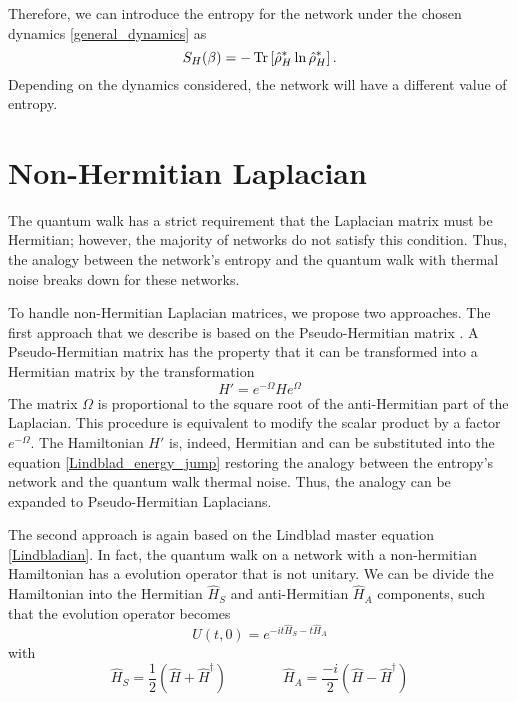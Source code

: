 Therefore, we can introduce the entropy for the network under the chosen dynamics \eqref{general_dynamics} as 
\begin{equation}
    S_H(\beta) = -\operatorname{Tr}\left[\hat\rho_H^*\ln\hat\rho_H^* \right].
\end{equation}
Depending on the dynamics considered, the network will have a different value of entropy.



\section{Non-Hermitian Laplacian}

The quantum walk has a strict requirement that the Laplacian matrix must be Hermitian; however, the majority of networks do not satisfy this condition. Thus, the analogy between the network's entropy and the quantum walk with thermal noise breaks down for these networks.

To handle non-Hermitian Laplacian matrices, we propose two approaches.
The first approach that we describe is based on the Pseudo-Hermitian matrix \cite{Pseudo_Hermitian}.
A Pseudo-Hermitian matrix has the property that it can be transformed into a Hermitian matrix by the transformation
\begin{equation}
    H' = e^{-\Omega} H e^{\Omega}
\end{equation}
The matrix $\Omega$ is proportional to the square root of the anti-Hermitian part of the Laplacian. This procedure is equivalent to modify the scalar product by a factor $e^{-\Omega}$.
The Hamiltonian $H'$ is, indeed, Hermitian and can be substituted into the equation \eqref{Lindblad_energy_jump} restoring the analogy between the entropy's network and the quantum walk thermal noise.
Thus, the analogy can be expanded to Pseudo-Hermitian Laplacians.

The second approach is again based on the Lindblad master equation \eqref{Lindbladian}.
In fact, the quantum walk on a network with a non-hermitian Hamiltonian has a evolution operator that is not unitary. We can be divide the Hamiltonian into the Hermitian $\hat H_S$ and anti-Hermitian $\hat H_A$ components, such that the evolution operator becomes
\begin{equation}\label{not_hermitian_time_operator}
    U(t,0) = e^{-it\hat H_S-t\hat H_A}
\end{equation}
with
\begin{equation}
    \hat H_S =  \frac{1}{2}\left(\hat H + \hat H^\dagger\right) \qquad \qquad
    \hat H_A = \frac{-i}{2}\left(\hat H - \hat H^\dagger\right)
\end{equation}

